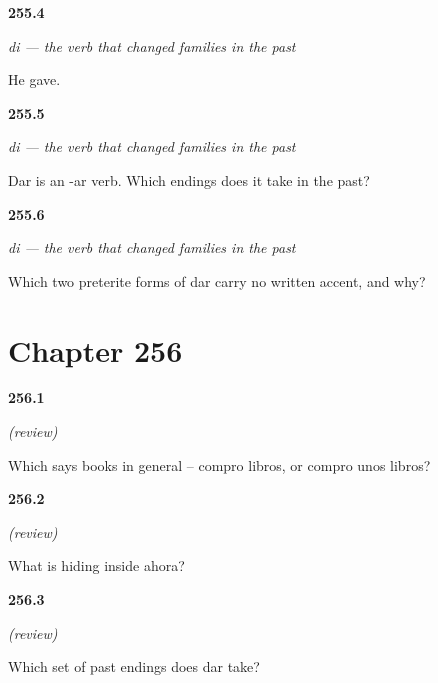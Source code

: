 \noindent\begin{minipage}[t]{\linewidth}
\raggedright
\hypertarget{review-ES-C65-di-gave}{\textbf{255.4}} \emph{di — the verb that changed families in the past}\par
\small He gave.
\end{minipage}\par\medskip

\noindent\begin{minipage}[t]{\linewidth}
\raggedright
\hypertarget{review-ES-C65-di-family}{\textbf{255.5}} \emph{di — the verb that changed families in the past}\par
\small Dar is an -ar verb. Which endings does it take in the past?
\end{minipage}\par\medskip

\noindent\begin{minipage}[t]{\linewidth}
\raggedright
\hypertarget{review-ES-C65-di-bare}{\textbf{255.6}} \emph{di — the verb that changed families in the past}\par
\small Which two preterite forms of dar carry no written accent, and why?
\end{minipage}\par\medskip

\section*{Chapter 256}

\noindent\begin{minipage}[t]{\linewidth}
\raggedright
\hypertarget{review-ES-C65-repaso-parejas-bare}{\textbf{256.1}} \emph{(review)}\par
\small Which says books in general -- compro libros, or compro unos libros?
\end{minipage}\par\medskip

\noindent\begin{minipage}[t]{\linewidth}
\raggedright
\hypertarget{review-ES-C65-repaso-parejas-hora}{\textbf{256.2}} \emph{(review)}\par
\small What is hiding inside ahora?
\end{minipage}\par\medskip

\noindent\begin{minipage}[t]{\linewidth}
\raggedright
\hypertarget{review-ES-C65-repaso-parejas-dar}{\textbf{256.3}} \emph{(review)}\par
\small Which set of past endings does dar take?
\end{minipage}\par\medskip

